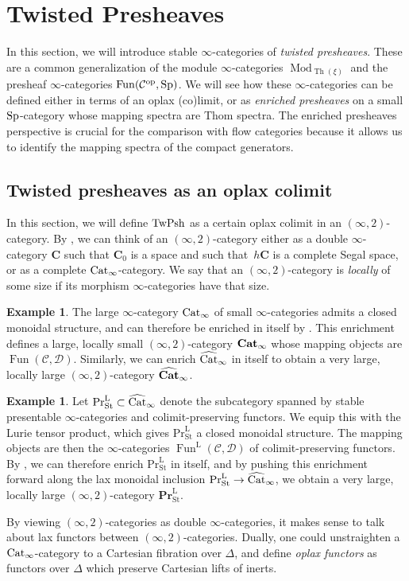 \documentclass[10pt]{amsart}
\numberwithin{equation}{section}
\theoremstyle{definition}
\newtheorem{ex}[prop]{Example}
\DeclareMathOperator{\Fun}{Fun}
\DeclareMathOperator{\Th}{Th}
\DeclareMathOperator{\Mod}{Mod}
\DeclareMathOperator{\op}{op}
\DeclareMathOperator{\St}{St}
\renewcommand{\Pr}{\mathrm{Pr}}
\newcommand{\bfPr}{\mathbf{Pr}}
\newcommand{\rL}{\mathrm{L}}
\newcommand{\PrLSt}{\Pr^{\rL}_{\St}}
\newcommand{\TwShv}{\mathrm{TwPsh}\vphantom{h}}
\newcommand{\Cat}{\mathrm{Cat}\vphantom{t}}
\newcommand{\bfCat}{\mathbf{Cat}\vphantom{t}}
\newcommand{\CatHat}{\widehat{\mathrm{Cat}}\vphantom{t}}
\newcommand{\Simp}{\mathbb{\Delta}}
\newcommand{\cC}{\mathcal{C}}
\newcommand{\calD}{\mathcal{D}}
\newcommand{\bfC}{\mathbf{C}}
\newcommand{\Sp}{\mathrm{Sp}\vphantom{p}}
\renewcommand{\to}{\mathchoice{\longrightarrow}{\rightarrow}{}{}}
\begin{document}
\section{Twisted Presheaves}\label{sec:twisted_presheaves}
In this section, we will introduce stable $\infty$-categories of \emph{twisted presheaves}.
These are a common generalization of the module $\infty$-categories $\Mod_{\Th(\xi)}$ and the presheaf $\infty$-categories $\Fun(\cC^{\op},\Sp)$.
We will see how these $\infty$-categories can be defined either in terms of an oplax (co)limit, or as \emph{enriched presheaves} on a small $\Sp$-category whose mapping spectra are Thom spectra.
The enriched presheaves perspective is crucial for the comparison with flow categories because it allows us to identify the mapping spectra of the compact generators.

\subsection{Twisted presheaves as an oplax colimit}\label{subsec:twisted_presheaves_as_an_oplax}
In this section, we will define $\TwShv$ as a certain oplax colimit in an $(\infty,2)$-category.
By , we can think of an $(\infty,2)$-category either as a double $\infty$-category $\bfC$ such that $\bfC_{0}$ is a space and such that~$h\bfC$ is a complete Segal space, or as a complete $\Cat_{\infty}$-category.
We say that an $(\infty,2)$-category is \emph{locally} of some size if its morphism $\infty$-categories have that size.
\begin{ex}
	The large $\infty$-category $\Cat_{\infty}$ of small $\infty$-categories admits a closed monoidal structure, and can therefore be enriched in itself by .
  This enrichment defines a large, locally small $(\infty,2)$-category $\bfCat_{\infty}$ whose mapping objects are $\Fun(\cC, \calD)$.
  Similarly, we can enrich $\CatHat_{\infty}$ in itself to obtain a very large, locally large $(\infty,2)$-category $\widehat{\bfCat}_{\infty}$.
\end{ex}
\begin{ex}
	Let $\PrLSt \subset \CatHat_{\infty}$ denote the subcategory spanned by stable presentable $\infty$-categories and colimit-preserving functors.
  We equip this with the Lurie tensor product, which gives $\PrLSt$ a closed monoidal structure.
  The mapping objects are then the $\infty$-categories $\Fun^{\rL}(\cC,\calD)$ of colimit-preserving functors.
  By , we can therefore enrich $\PrLSt$ in itself, and by pushing this enrichment forward along the lax monoidal inclusion $\PrLSt \to \CatHat_{\infty}$, we obtain a very large, locally large $(\infty,2)$-category $\bfPr^{\rL}_{\St}$.
\end{ex}
By viewing $(\infty,2)$-categories as double $\infty$-categories, it makes sense to talk about lax functors between $(\infty,2)$-categories.
Dually, one could unstraighten a $\Cat_{\infty}$-category to a Cartesian fibration over $\Simp$, and define \emph{oplax functors} as functors over $\Simp$ which preserve Cartesian lifts of inerts.
\end{document}
